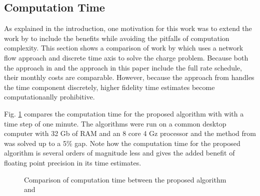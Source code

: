 \subsection{Computation Time\label{sec:results:time}} 
As explained in the introduction, one motivation for this work was to extend the work by \cite{mortensen_comprehensive_2021} to include the benefits while avoiding the pitfalls of computation complexity. This section shows a comparison of work by \cite{mortensen_comprehensive_2021} which uses a network flow approach and discrete time axis to solve the charge problem. Because both the approach in \cite{mortensen_comprehensive_2021} and the approach in this paper include the full rate schedule, their monthly costs are comparable. However, because the approach from \cite{mortensen_comprehensive_2021} handles the time component discretely, higher fidelity time estimates become computationanlly prohibitive. 
\par Fig. \ref{fig:timeComparison} compares the computation time for the proposed algorithm with \cite{mortensen_comprehensive_2021} with a time step of one minute. The algorithms were run on a common desktop computer with 32 Gb of RAM and an 8 core 4 Gz processor and the method from \cite{mortensen_comprehensive_2021} was solved up to a 5\% gap. Note how the computation time for the proposed algorithm is several orders of magnitude less and gives the added benefit of floating point precision in its time estimates.
\begin{figure}
	\centering
	\caption{Comparison of computation time between the proposed algorithm and \cite{mortensen_comprehensive_2021}}
	\label{fig:timeComparison}
\end{figure}







